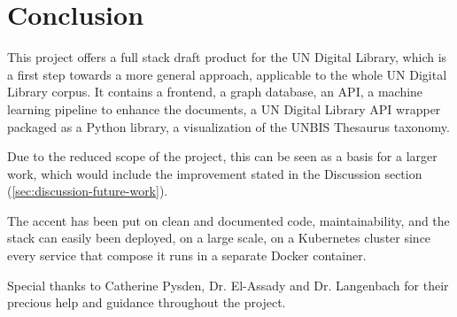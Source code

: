 \section*{Conclusion} \label{sec:conclusion}

This project offers a full stack draft product for the UN Digital Library, which is a first step towards a more general approach, applicable to the whole UN Digital Library corpus. It contains a frontend, a graph database, an API, a machine learning pipeline to enhance the documents, a UN Digital Library API wrapper packaged as a Python library, a visualization of the UNBIS Thesaurus taxonomy.

Due to the reduced scope of the project, this can be seen as a basis for a larger work, which would include the improvement stated in the Discussion section (\ref{sec:discussion-future-work}).

The accent has been put on clean and documented code, maintainability, and the stack can easily been deployed, on a large scale, on a Kubernetes cluster since every service that compose it runs in a separate Docker container.

Special thanks to Catherine Pysden, Dr. El-Assady and Dr. Langenbach for their precious help and guidance throughout the project.